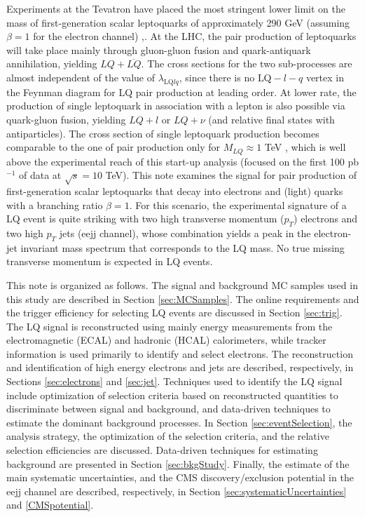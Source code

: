 Experiments at the Tevatron have placed the most stringent lower limit on the mass of first-generation scalar 
leptoquarks of approximately 290 GeV (assuming $\beta=1$ for the electron channel) \cite{d02008},\cite{cdf2005}.
At the LHC, the pair production of leptoquarks will take place mainly through gluon-gluon fusion and 
quark-antiquark annihilation, yielding $LQ + \overline{LQ}$. 
The cross sections for the two sub-processes are almost independent of the value of 
$\lambda_{\mbox{LQ}lq}$, since there is no $\mbox{LQ}-l-q$ vertex in the Feynman diagram for LQ pair production 
at leading order. At lower rate, the production of single leptoquark in association with a lepton is also possible via quark-gluon 
fusion, yielding $LQ+ l$ or $LQ+ \nu$ (and relative final states with antiparticles). The cross section of single leptoquark production
becomes comparable to the one of pair production only for $M_{LQ}\approx 1$ TeV \cite{LQSingleAndPairProd}, 
which is well above the experimental reach of this start-up analysis (focused on the first 100 pb$^{-1}$ of data at $\sqrt{s}=10$ TeV).  
This note examines the signal for pair production of first-generation scalar leptoquarks that decay into electrons and 
(light) quarks with a branching ratio $\beta=1$. 
For this scenario, the experimental signature of a LQ event is quite striking with two 
high transverse momentum ($p_T$) electrons and two high $p_T$ jets (eejj channel), 
whose combination yields a peak in the electron-jet invariant mass 
spectrum that corresponds to the LQ mass. No true missing transverse momentum is expected in LQ events.

This note is organized as follows. 
The signal and background MC samples used in this study are described in Section \ref{sec:MCSamples}.
The online requirements and the trigger efficiency for selecting LQ events are discussed in Section \ref{sec:trig}.
The LQ signal is reconstructed using mainly energy measurements from the
electromagnetic (ECAL) and hadronic (HCAL) calorimeters, while tracker information 
is used primarily to identify and select electrons. 
The reconstruction and identification of high energy electrons and jets are described, respectively, 
in Sections \ref{sec:electrons} and \ref{sec:jet}.
Techniques used to identify the LQ signal include optimization of selection criteria based on 
reconstructed quantities to discriminate between signal and background, 
and data-driven techniques to estimate the dominant background processes.
In Section \ref{sec:eventSelection}, the analysis strategy, the optimization of the selection criteria, 
and the relative selection efficiencies are discussed. 
Data-driven techniques for estimating background are presented in Section \ref{sec:bkgStudy}.
Finally, the estimate of the main systematic uncertainties, and the CMS discovery/exclusion potential 
in the eejj channel are described, respectively, in Section \ref{sec:systematicUncertainties} and \ref{CMSpotential}.


